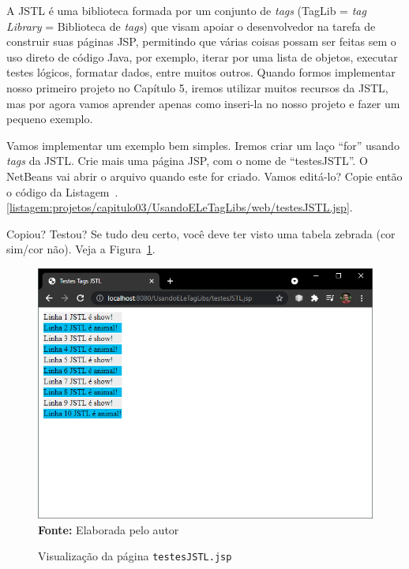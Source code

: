 A JSTL é uma biblioteca formada por um conjunto de \textit{tags} (TagLib = \textit{tag} \textit{Library} = Biblioteca de \textit{tags}) que visam apoiar o desenvolvedor na tarefa de construir suas páginas JSP, permitindo que várias coisas possam ser feitas sem o uso direto de código Java, por exemplo, iterar por uma lista de objetos, executar testes lógicos, formatar dados, entre muitos outros. Quando formos implementar nosso primeiro projeto no Capítulo 5, iremos utilizar muitos recursos da JSTL, mas por agora vamos aprender apenas como inseri-la no nosso projeto e fazer um pequeno exemplo.

Vamos implementar um exemplo bem simples. Iremos criar um laço ``for'' usando \textit{tags} da JSTL. Crie mais uma página JSP, com o nome de ``testesJSTL''. O NetBeans vai abrir o arquivo quando este for criado. Vamos editá-lo? Copie então o código da Listagem~\thechapter.\ref{listagem:projetos/capitulo03/UsandoELeTagLibs/web/testesJSTL.jsp}.


Copiou? Testou? Se tudo deu certo, você deve ter visto uma tabela zebrada (cor sim/cor não). Veja a Figura~\ref{fig:cap03VisualizacaoTestesJSTL}.

\FloatBarrier
\begin{figure}[!htbp]
    \centering
    \caption{Visualização da página \texttt{testesJSTL.jsp}}
    \includegraphics[scale=0.7]{imagens/cap03VisualizacaoTestesJSTL}
    \\\textbf{Fonte:} Elaborada pelo autor
    \label{fig:cap03VisualizacaoTestesJSTL}
\end{figure}
\FloatBarrier

